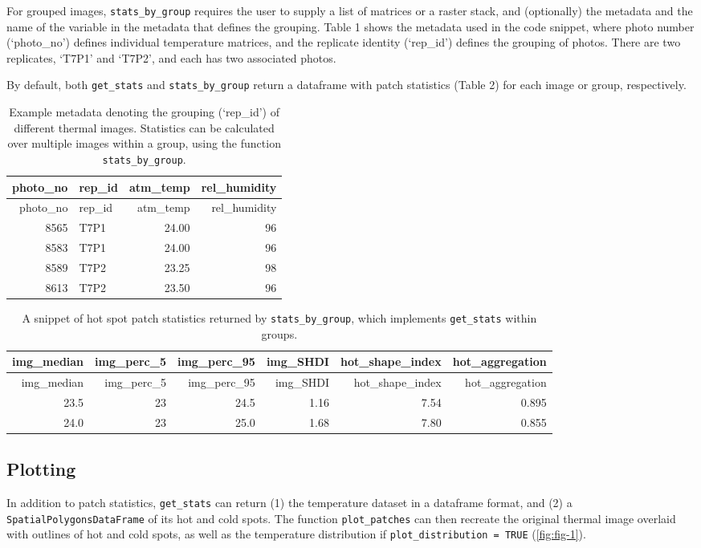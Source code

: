 \documentclass[12pt,british,a4paper,]{article}
\begin{document}
For grouped images, \texttt{stats\_by\_group} requires the user to supply a list of matrices or a raster stack, and (optionally) the metadata and the name of the variable in the metadata that defines the grouping. Table 1 shows the metadata used in the code snippet, where photo number (`photo\_no') defines individual temperature matrices, and the replicate identity (`rep\_id') defines the grouping of photos. There are two replicates, `T7P1' and `T7P2', and each has two associated photos.

By default, both \texttt{get\_stats} and \texttt{stats\_by\_group} return a dataframe with patch statistics (Table 2) for each image or group, respectively.

\begin{longtable}[]{@{}rlrr@{}}
\caption{Example metadata denoting the grouping (`rep\_id') of different thermal images. Statistics can be calculated over multiple images within a group, using the function \texttt{stats\_by\_group}.}\tabularnewline
\toprule
photo\_no & rep\_id & atm\_temp & rel\_humidity\tabularnewline
\midrule
\endfirsthead
\toprule
photo\_no & rep\_id & atm\_temp & rel\_humidity\tabularnewline
\midrule
\endhead
8565 & T7P1 & 24.00 & 96\tabularnewline
8583 & T7P1 & 24.00 & 96\tabularnewline
8589 & T7P2 & 23.25 & 98\tabularnewline
8613 & T7P2 & 23.50 & 96\tabularnewline
\bottomrule
\end{longtable}

\begin{longtable}[]{@{}rrrrrr@{}}
\caption{A snippet of hot spot patch statistics returned by \texttt{stats\_by\_group}, which implements \texttt{get\_stats} within groups.}\tabularnewline
\toprule
img\_median & img\_perc\_5 & img\_perc\_95 & img\_SHDI & hot\_shape\_index & hot\_aggregation\tabularnewline
\midrule
\endfirsthead
\toprule
img\_median & img\_perc\_5 & img\_perc\_95 & img\_SHDI & hot\_shape\_index & hot\_aggregation\tabularnewline
\midrule
\endhead
23.5 & 23 & 24.5 & 1.16 & 7.54 & 0.895\tabularnewline
24.0 & 23 & 25.0 & 1.68 & 7.80 & 0.855\tabularnewline
\bottomrule
\end{longtable}

\hypertarget{plotting}{%
\subsection{Plotting}\label{plotting}}

In addition to patch statistics, \texttt{get\_stats} can return (1) the temperature dataset in a dataframe format, and (2) a \texttt{SpatialPolygonsDataFrame} of its hot and cold spots. The function \texttt{plot\_patches} can then recreate the original thermal image overlaid with outlines of hot and cold spots, as well as the temperature distribution if \texttt{plot\_distribution\ =\ TRUE} (\autoref{fig:fig-1}).
\end{document}
